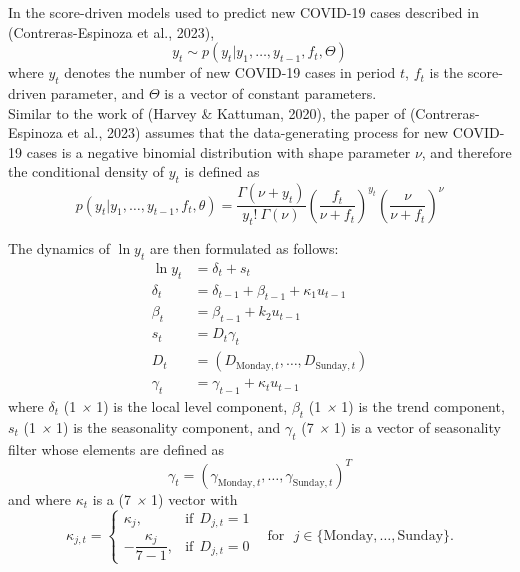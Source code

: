 In the score-driven models used to predict new COVID-19 cases described in (Contreras-Espinoza et al., 2023),
\begin{equation*}
    y_t \sim p(y_t|y_1,\dots,y_{t-1}, f_t, \Theta)
\end{equation*}
where $y_t$ denotes the number of new COVID-19 cases in period $t$, $f_t$ is the score-driven parameter, and $\Theta$ is a vector of constant parameters. \\

Similar to the work of (Harvey \& Kattuman, 2020), the paper of (Contreras-Espinoza et al., 2023) assumes that the data-generating process for new COVID-19 cases is a negative binomial distribution with shape parameter $\nu$, and therefore the conditional density of $y_t$ is defined as
\begin{equation}\label{eq:NB}
    p(y_t|y_1, \dots,y_{t-1}, f_t, \theta) = \dfrac{\Gamma(\nu + y_t)}{y_t ! \ \Gamma(\nu)}  \left(\dfrac{f_t}{\nu+f_t}\right)^{y_t} \left(\dfrac{\nu}{\nu+f_t}\right)^{\nu}
\end{equation}

The dynamics of $\ln y_t$ are then formulated as follows:
\begin{align}
    \ln y_t & = \delta_t + s_t \\
    \delta_t &= \delta_{t-1} + \beta_{t-1} + \kappa_1 u_{t-1} \label{eq:SD1_1}\\
    \beta_t &= \beta_{t-1} + k_2 u_{t-1} \label{eq:SD1_2}\\
    s_t &= D_t \gamma_t \\
    D_t &= (D_{\text{Monday},t}, \dots, D_{\text{Sunday},t}) \\
    \gamma_t &= \gamma_{t-1} + \kappa_t u_{t-1} \label{eq:SD1_3}
\end{align}
where $\delta_t$ (1 \emph{×} 1) is the local level component, $\beta_t$ (1 \emph{×} 1) is the trend component, $s_t$ (1 \emph{×} 1) is the seasonality component, and $\gamma_t$ (7 \emph{×} 1) is a vector of seasonality filter whose elements are defined as
\begin{equation}
    \gamma_t = (\gamma_{\text{Monday},t}, \dots, \gamma_{\text{Sunday},t})^{T}
\end{equation}
and where $\kappa_t$ is a (7 \emph{×} 1) vector with
\begin{equation}
    \kappa_{j, t} = \begin{cases}
        \kappa_j, & \text{if} \ \ D_{j,t} = 1 \\
        -\dfrac{\kappa_j}{7-1}, & \text{if} \ \ D_{j,t} = 0
    \end{cases} \ \ \ \ \text{for} \ \ \ j \in \{ \text{Monday}, \dots, \text{Sunday}\}.
\end{equation}

